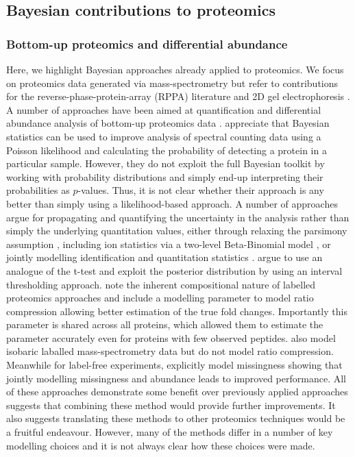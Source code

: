 \documentclass[12pt,english]{article}
\begin{document}
\subsection{Bayesian contributions to proteomics}
\subsubsection{Bottom-up proteomics and differential abundance}
Here, we highlight Bayesian approaches already applied to proteomics. We focus on proteomics data generated via mass-spectrometry but refer to contributions for the reverse-phase-protein-array (RPPA) literature \citep{Crook::2019, Ni::2019, Maity::2020} and 2D gel electrophoresis \citep{Morris::2011}. A number of approaches have been aimed at quantification and differential abundance analysis of bottom-up proteomics data \citep{Phillips::2021, The::2021, The::2019, Santra::2016, Peshkin::2019, Millikin::2020, Serang::2013, OBrien::2018, Serang::2012, Carvalho::2011}. \citet{Carvalho::2011} appreciate that Bayesian statistics can be used to improve analysis of spectral counting data using a Poisson likelihood and calculating the probability of detecting a protein in a particular sample. However, they do not exploit the full Bayesian toolkit by working with probability distributions and simply end-up interpreting their probabilities as $p$-values. Thus, it is not clear whether their approach is any better than simply using a likelihood-based approach. A number of approaches \citep{The::2021, The::2019, Peshkin::2019, Serang::2012} argue for propagating and quantifying the uncertainty in the analysis rather than simply the underlying quantitation values, either through relaxing the parsimony assumption \citep{Serang::2012}, including ion statistics via a two-level Beta-Binomial model \citep{Peshkin::2019}, or jointly modelling identification and quantitation statistics \citep{The::2019, The::2021}. \citet{Millikin::2020} argue to use an analogue of the t-test and exploit the posterior distribution by using an interval thresholding approach. \citet{OBrien::2018} note the inherent compositional nature of labelled proteomics approaches and include a modelling parameter to model ratio compression allowing better estimation of the true fold changes. Importantly this parameter is shared across all proteins, which allowed them to estimate the parameter accurately even for proteins with few observed peptides. \citet{Jow::2014} also model isobaric laballed mass-spectrometry data but do not model ratio compression. Meanwhile for label-free experiments, \citet{OBrien::2018b} explicitly model missingness showing that jointly modelling missingness and abundance leads to improved performance. All of these approaches demonstrate some benefit over previously applied approaches suggests that combining these method would provide further improvements. It also suggests translating these methods to other proteomics techniques would be a fruitful endeavour. However, many of the methods differ in a number of key modelling choices and it is not always clear how these choices were made.
\end{document}
